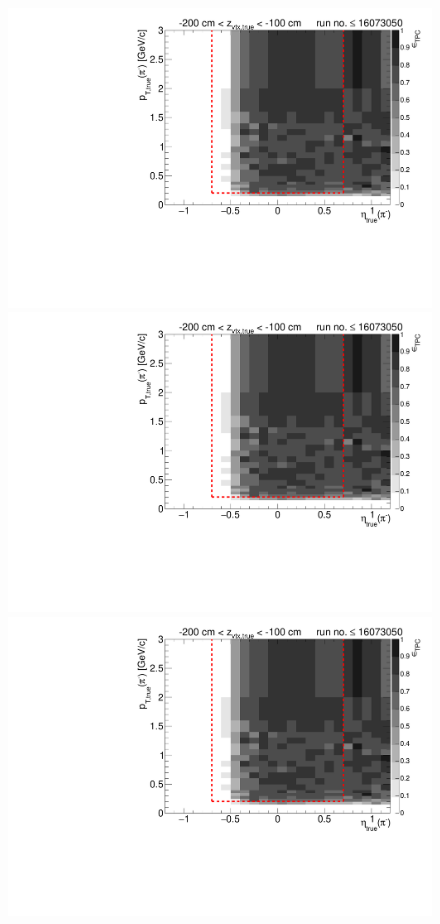\begin{figure}[hb]\ContinuedFloat
\centering
\parbox{0.495\textwidth}{
  \centering
  \includegraphics[width=\linewidth,page=11]{graphics/eff/Eff2D_TPC_pion_Minus_RunRange1.pdf}\\
  \includegraphics[width=\linewidth,page=13]{graphics/eff/Eff2D_TPC_pion_Minus_RunRange1.pdf}\\
  \includegraphics[width=\linewidth,page=15]{graphics/eff/Eff2D_TPC_pion_Minus_RunRange1.pdf}\\
}
\end{figure}
